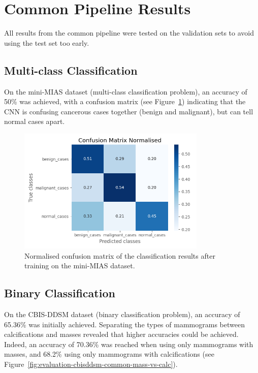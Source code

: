 \section{Common Pipeline Results}

All results from the common pipeline were tested on the validation sets to avoid using the test set too early.

\subsection{Multi-class Classification}

On the mini-MIAS dataset (multi-class classification problem), an accuracy of 50\% was achieved, with a confusion matrix (see Figure~\ref{fig:evaluation-common-CM-norm_basic-model_mini-MIAS-dataset}) indicating that the CNN is confusing cancerous cases together (benign and malignant), but can tell normal cases apart.

\begin{figure}[ht]
\centerline{\includegraphics[width=0.8\textwidth]{figures/evaluation/common/CM-norm_basic-model_mini-MIAS-dataset.png}}
\caption{\label{fig:evaluation-common-CM-norm_basic-model_mini-MIAS-dataset}Normalised confusion matrix of the classification results after training on the mini-MIAS dataset.}
\end{figure}

\subsection{Binary Classification}

On the CBIS-DDSM dataset (binary classification problem), an accuracy of 65.36\% was initially achieved. Separating the types of mammograms between calcifications and masses revealed that higher accuracies could be achieved. Indeed, an accuracy of 70.36\% was reached when using only mammograms with masses, and 68.2\%  using only mammograms with calcifications (see Figure~\ref{fig:evaluation-cbisddsm-common-mass-vs-calc}).

